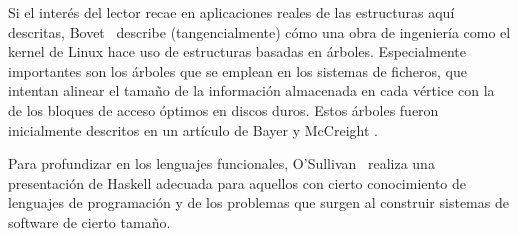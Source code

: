 \documentclass[10pt,spanish,twocolumn]{article}
\begin{document}
Si el interés del lector recae en aplicaciones reales de las estructuras aquí 
descritas, Bovet~\cite{Bovet:05} describe (tangencialmente) cómo una obra de 
ingeniería como el kernel de Linux hace uso de estructuras basadas en árboles.  
Especialmente importantes son los árboles que se emplean en los sistemas de 
ficheros, que intentan alinear el tamaño de la información almacenada en cada 
vértice con la de los bloques de acceso óptimos en discos duros.  Estos árboles 
fueron inicialmente descritos en un artículo de Bayer y McCreight 
\cite{DBLP:journals/acta/BayerM72}.

Para profundizar en los lenguajes funcionales, O'Sullivan~\cite{OSullivan:08} 
realiza una presentación de Haskell adecuada para aquellos con cierto 
conocimiento de lenguajes de programación y de los problemas que surgen al 
construir sistemas de software de cierto tamaño.



\end{document}

